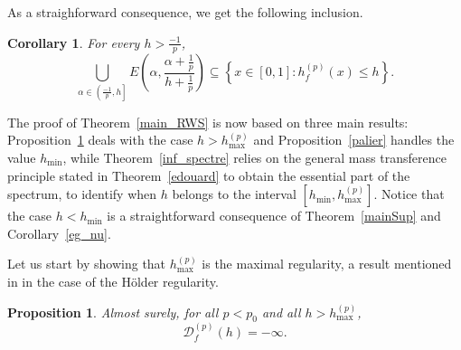 \documentclass[a4paper,11pt,oneside]{article}
\newcommand{\ccint}[1]{\left[{#1}\right]}
\newcommand{\ocint}[1]{\left({#1}\right]}
\theoremstyle{definition}
\theoremstyle{plain}
\newtheorem{prop}[defi]{Proposition}
\newtheorem{cor}[defi]{Corollary}
\begin{document}
As a straighforward consequence, we get the following inclusion.

\begin{cor}\label{E_exp_2}
For every $h>\frac{-1}{p}$,
\[
\bigcup_{\alpha\in\ocint{\frac{-1}{p},h}}E\left(\alpha,\frac{\alpha+\frac{1}{p}}{h+\frac{1}{p}}\right)\subseteq \left\{x\in\ccint{0,1}:h^{(p)}_f(x)\leq h\right\}.
\]
\end{cor}

The proof of Theorem~\ref{main_RWS} is now based on three main results: Proposition~\ref{reg_max} deals with the case $h>h_{\max}^{(p)}$ and Proposition~\ref{palier} handles the value $h_{\min}$, while Theorem~\ref{inf_spectre} relies on the general mass transference principle stated in Theorem~\ref{edouard} to obtain the essential part of the spectrum, to identify when $h$ belongs to the interval $\ccint{h_{\min},h_{\max}^{(p)}}$. Notice that the case $h<h_{\min}$ is a straightforward consequence of Theorem~\ref{mainSup} and Corollary~\ref{eg_nu}.

\medskip

Let us start by showing that $h_{\max}^{(p)}$ is the maximal regularity, a result mentioned in \cite{RWS} in the case of the H\"older regularity.

\begin{prop}\label{reg_max}
Almost surely, for all $p<p_0$ and all $h>h_{\max}^{(p)}$,
\[
\mathscr{D}^{(p)}_f(h)=-\infty.
\]
\end{prop}
\end{document}
